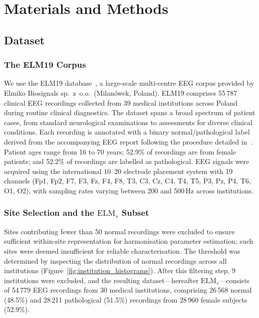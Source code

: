 \documentclass[preprint,12pt]{elsarticle}
\begin{document}
\section{Materials and Methods}
\label{sec:methods}

\subsection{Dataset}
\label{subsec:dataset}

\subsubsection{The ELM19 Corpus}

We use the ELM19 database~\cite{poziomska2026quantity}, a large-scale
multi-centre EEG corpus provided by Elmiko Biosignals sp.~z~o.o.\
(Milanówek, Poland).
ELM19 comprises 55\,787 clinical EEG recordings collected from
39 medical institutions across Poland during routine clinical
diagnostics.
The dataset spans a broad spectrum of patient cases, from standard
neurological examinations to assessments for diverse clinical
conditions.
Each recording is annotated with a binary normal/pathological label
derived from the accompanying EEG report following the procedure
detailed in~\cite{poziomska2026quantity}.
Patient ages range from 16 to 70 years; 52.9\% of recordings are from
female patients; and 52.2\% of recordings are labelled as
pathological.
EEG signals were acquired using the international 10--20 electrode
placement system with 19 channels (Fp1, Fp2, F7, F3, Fz, F4, F8,
T3, C3, Cz, C4, T4, T5, P3, Pz, P4, T6, O1, O2), with sampling
rates varying between 200 and 500\,Hz across institutions.

\subsubsection{Site Selection and the
  \texorpdfstring{$\mathrm{ELM}_s$}{ELMs} Subset}

Sites contributing fewer than 50 normal recordings were excluded to
ensure sufficient within-site representation for harmonisation
parameter estimation; such sites were deemed insufficient for reliable
characterisation.
The threshold was determined by inspecting the distribution of normal
recordings across all institutions
(Figure~\ref{fig:institution_histograms}).
After this filtering step, 9 institutions were excluded, and the
resulting dataset---hereafter $\mathrm{ELM}_s$---consists of 54\,779
EEG recordings from 30 medical institutions, comprising 26\,568
normal (48.5\%) and 28\,211 pathological (51.5\%) recordings from
28\,960 female subjects (52.9\%).
\end{document}
